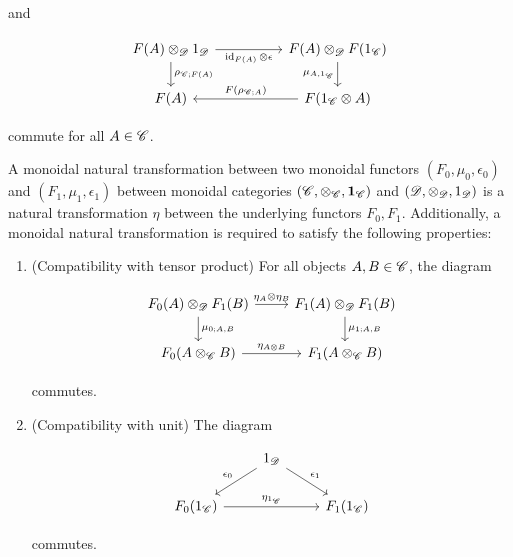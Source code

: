 \begin{definition}
\begin{enumerate}
and

\[\begin{tikzcd}
	{F(A)\otimes_{\Dcat}1_{\Dcat}} && {F(A)\otimes_{\Dcat}F(1_{\C})} \\
	{F(A)} && {F(1_{\C}\otimes A)}
	\arrow["{\rho_{\C;F(A)}}", from=1-1, to=2-1]
	\arrow["{F(\rho_{\C;A})}"', from=2-3, to=2-1]
	\arrow["{\mu_{A,1_{\C}}}"', from=1-3, to=2-3]
	\arrow["{\id_{F(A)}\otimes\epsilon}"', from=1-1, to=1-3]
\end{tikzcd}\]

commute for all $A\in \mathscr{C}$.
\end{enumerate}

\raggedleft\qedsymbol{}
\end{definition}


\begin{definition} A monoidal natural transformation between two monoidal functors $(F_0,\mu_0,\epsilon_0)$ and $(F_1,\mu_1,\epsilon_1)$ between monoidal categories $(\mathscr{C},\otimes_{\mathscr{C}},\mathbf{1}_{\mathscr{C}})$ and $(\mathscr{D},\otimes_{\mathscr{D}},1_{\mathscr{D}})$ is a natural transformation $\eta$ between the underlying functors $F_0,F_1$. Additionally, a monoidal natural transformation is required to satisfy the following properties:

\begin{enumerate}
\item (Compatibility with tensor product) For all objects $A,B\in \mathscr{C}$, the diagram

\[\begin{tikzcd}
	{F_0(A)\otimes_{\Dcat}F_1(B)} & {F_1(A)\otimes_{\Dcat}F_1(B)} \\
	{F_0(A\otimes_{\C} B)} & {F_1(A\otimes_{\C} B)}
	\arrow["{\mu_{0;A,B}}", from=1-1, to=2-1]
	\arrow["{\mu_{1;A,B}}", from=1-2, to=2-2]
	\arrow["{\eta_A\otimes \eta_B}", from=1-1, to=1-2]
	\arrow["{\eta_{A\otimes B}}", from=2-1, to=2-2]
\end{tikzcd}\]

commutes.

\item (Compatibility with unit) The diagram

\[\begin{tikzcd}
	& {1_{\Dcat}} \\
	{F_0(1_{\C})} && {F_1(1_{\C})}
	\arrow["{\eta_{1_{\C}}}", from=2-1, to=2-3]
	\arrow["{\epsilon_0}"', from=1-2, to=2-1]
	\arrow["{\epsilon_1}", from=1-2, to=2-3]
\end{tikzcd}\]

commutes.
\end{enumerate}
\raggedleft\qedsymbol{}
\end{definition}


